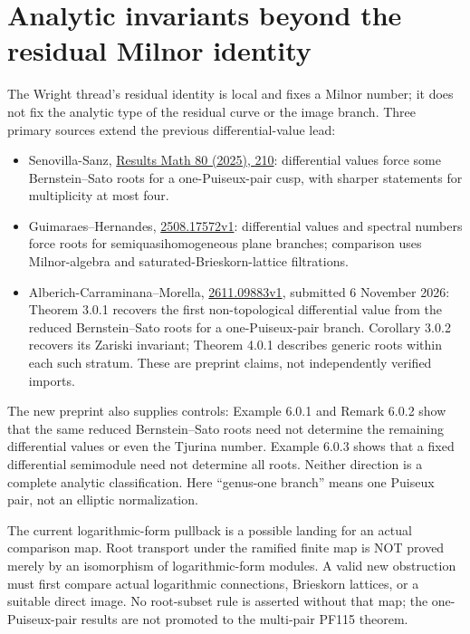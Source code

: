 \documentclass{article}
\begin{document}
\section{Analytic invariants beyond the residual Milnor identity}
The Wright thread's residual identity is local and fixes a Milnor number; it does not fix the analytic type of the residual curve or the image branch. Three primary sources extend the previous differential-value lead:
\begin{itemize}
\item Senovilla-Sanz, \href{https://doi.org/10.1007/s00025-025-02524-0}{Results Math 80 (2025), 210}: differential values force some Bernstein--Sato roots for a one-Puiseux-pair cusp, with sharper statements for multiplicity at most four.
\item Guimaraes--Hernandes, \href{https://arxiv.org/abs/2508.17572v1}{2508.17572v1}: differential values and spectral numbers force roots for semiquasihomogeneous plane branches; comparison uses Milnor-algebra and saturated-Brieskorn-lattice filtrations.
\item Alberich-Carraminana--Morella, \href{https://arxiv.org/abs/2611.09883v1}{2611.09883v1}, submitted 6 November 2026: Theorem 3.0.1 recovers the first non-topological differential value from the reduced Bernstein--Sato roots for a one-Puiseux-pair branch. Corollary 3.0.2 recovers its Zariski invariant; Theorem 4.0.1 describes generic roots within each such stratum. These are preprint claims, not independently verified imports.
\end{itemize}
The new preprint also supplies controls: Example 6.0.1 and Remark 6.0.2 show that the same reduced Bernstein--Sato roots need not determine the remaining differential values or even the Tjurina number. Example 6.0.3 shows that a fixed differential semimodule need not determine all roots. Neither direction is a complete analytic classification. Here ``genus-one branch'' means one Puiseux pair, not an elliptic normalization.

The current logarithmic-form pullback is a possible landing for an actual comparison map. Root transport under the ramified finite map is NOT proved merely by an isomorphism of logarithmic-form modules. A valid new obstruction must first compare actual logarithmic connections, Brieskorn lattices, or a suitable direct image. No root-subset rule is asserted without that map; the one-Puiseux-pair results are not promoted to the multi-pair PF115 theorem.
\end{document}
